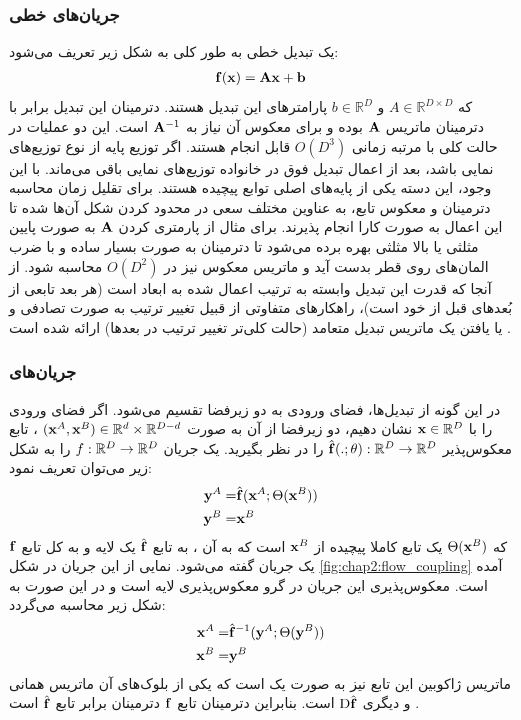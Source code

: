 \subsubsection{جریان‌های خطی}
یک تبدیل خطی به طور کلی به شکل زیر تعریف می‌شود:
\begin{align}
	{\bf f}({\bf x}) = {\bf A}{\bf x} + {\bf b}
\end{align}
که $A \in \mathbb{R}^{D \times D}$ و $b \in \mathbb{R}^D$ پارامتر‌های این تبدیل هستند. دترمینان این تبدیل برابر با دترمینان ماتریس ${\bf A}$ بوده و برای معکوس آن نیاز به ${\bf A}^{-1}$ است.
این دو عملیات در حالت کلی با مرتبه زمانی
$O(D^3)$
قابل انجام هستند. اگر توزیع پایه از نوع توزیع‌های نمایی باشد، بعد از اعمال تبدیل فوق در خانواده توزیع‌های نمایی باقی می‌ماند. با این وجود، این دسته یکی از پایه‌های اصلی توابع پیچیده هستند. برای تقلیل زمان محاسبه دترمینان و معکوس تابع، به عناوین مختلف سعی در محدود کردن شکل آن‌ها شده تا این اعمال به صورت کارا انجام پذیرند. برای مثال از پارمتری کردن ${\bf A}$ به صورت پایین مثلثی یا بالا مثلثی بهره برده می‌شود تا دترمینان به صورت بسیار ساده و با ضرب المان‌های روی قطر بدست آید و ماتریس معکوس نیز در $O(D^2)$ محاسبه شود. از آنجا که قدرت این تبدیل وابسته به ترتیب اعمال شده به ابعاد است (هر بعد تابعی از بُعدهای قبل از خود است)، راهکارهای متفاوتی از قبیل تغییر ترتیب به صورت تصادفی و یا یافتن یک ماتریس تبدیل متعامد (حالت کلی‌تر تغییر ترتیب در بعدها) ارائه شده است \cite{flow_survey, glow}.
\subsubsection{جریان‌های
}
در این گونه از تبدیل‌ها، فضای ورودی به دو زیرفضا تقسیم می‌شود. اگر فضای ورودی را با
${\bf x} \in {\mathbb{R}}^D$
نشان دهیم، دو زیرفضا از آن به صورت
$({\bf x}^A, {\bf x}^B) \in {\mathbb{R}}^d \times {\mathbb{R}}^{D - d}$
، تابع معکوس‌پذیر
$\hat{{\bf f}}(.; \theta) : {\mathbb{R}}^D \rightarrow {\mathbb{R}}^D$
را در نظر بگیرید. یک جریان \coupling{}
$f : {\mathbb{R}}^D \rightarrow {\mathbb{R}}^D$
را به شکل زیر می‌توان تعریف نمود:
\begin{align}
	{\bf y}^A = & \hat{{\bf f}} ({\bf x}^A; \Theta({\bf x}^B))
	\nonumber
	\\
	{\bf y}^B = & {\bf x}^B
\end{align}
که $\Theta({\bf x}^B)$ یک تابع کاملا پیچیده از ${\bf x}^B$ است که به آن
، به تابع $\hat{{\bf f}}$ یک لایه \coupling{} و به کل تابع ${\bf f}$ یک جریان \coupling{} گفته می‌شود. نمایی از این جریان در شکل \ref{fig:chap2:flow_coupling} آمده است. معکوس‌پذیری این جریان در گرو معکوس‌پذیری لایه \coupling{} است و در این صورت به شکل زیر محاسبه می‌گردد:
\begin{align}
	{\bf x}^A = & \hat{{\bf f}}^{-1} ({\bf y}^A; \Theta({\bf y}^B))
	\nonumber
	\\
	{\bf x}^B = & {\bf y}^B
\end{align}
ماتریس ژاکوبین این تابع نیز به صورت یک
است که یکی از بلوک‌های آن ماتریس همانی و دیگری $\text{D}\hat{{\bf f}}$ است. بنابراین دترمینان  تابع ${\bf f}$ دترمینان برابر تابع $\hat{{\bf f}}$ است \cite{flow_survey, realnvp, glow}.


